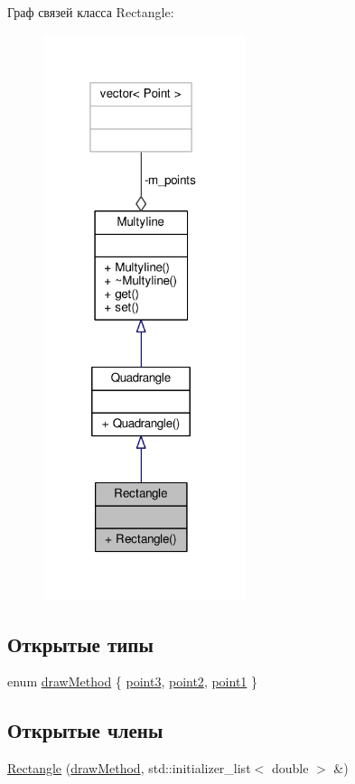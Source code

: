 Граф связей класса Rectangle\-:
\nopagebreak
\begin{figure}[H]
\begin{center}
\leavevmode
\includegraphics[width=167pt]{class_rectangle__coll__graph}
\end{center}
\end{figure}
\subsection*{Открытые типы}
\begin{DoxyCompactItemize}
\item 
enum \hyperlink{class_rectangle_a89fbf9e00116333aaa820d66f940462f}{draw\-Method} \{ \hyperlink{class_rectangle_a89fbf9e00116333aaa820d66f940462fa0899aa004a2bdd5ca0a442c05a2fdb70}{point3}, 
\hyperlink{class_rectangle_a89fbf9e00116333aaa820d66f940462fa6083fe468bbf9e5a1b0cc8faaf4579f3}{point2}, 
\hyperlink{class_rectangle_a89fbf9e00116333aaa820d66f940462fab936647558e60d8993ec9758f1bee652}{point1}
 \}
\end{DoxyCompactItemize}
\subsection*{Открытые члены}
\begin{DoxyCompactItemize}
\item 
\hyperlink{class_rectangle_a436ec626a20dd8355999fc7d61475c1b}{Rectangle} (\hyperlink{class_multyline_ad75d7bb224267d0d7b4c40fd72a1d920}{draw\-Method}, std\-::initializer\-\_\-list$<$ double $>$ \&)
\end{DoxyCompactItemize}


